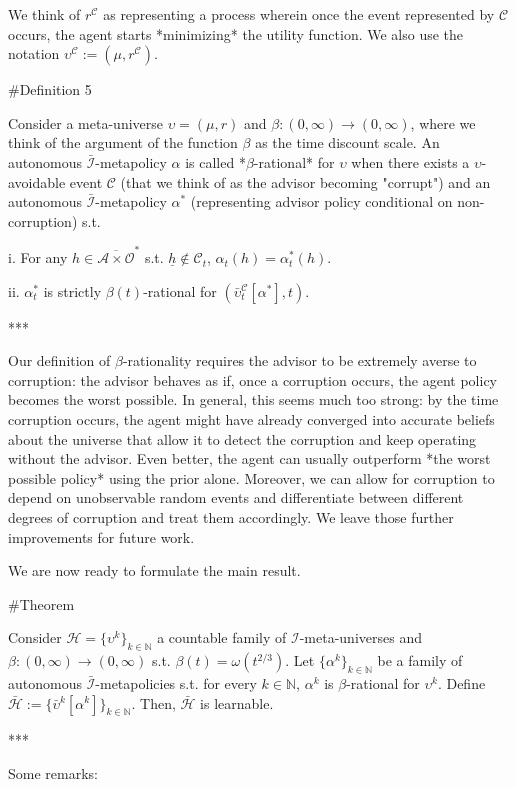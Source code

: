 \documentclass[a4paper]{article}
\newcommand{\Nats}{\mathbb{N}}
\newcommand{\Ob}{\mathcal{O}}
\newcommand{\A}{\mathcal{A}}
\newcommand{\I}{\mathcal{I}}
\newcommand{\Adi}{\bar{\I}}
\newcommand{\Adao}{\overline{\A \times \Ob}}
\newcommand{\Adfh}{\Adao^*}
\newcommand{\Hy}{\mathcal{H}}
\newcommand{\Co}{\mathcal{C}}
\begin{document}
We think of $r^\Co$ as representing a process wherein once the event represented by $\Co$ occurs, the agent starts *minimizing* the utility function. We also use the notation $\upsilon^\Co:=(\mu,r^\Co)$.

\#Definition 5

Consider a meta-universe $\upsilon=(\mu,r)$ and $\beta: (0,\infty) \rightarrow (0,\infty)$, where we think of the argument of the function $\beta$ as the time discount scale. An autonomous $\Adi$-metapolicy $\alpha$ is called *$\beta$-rational* for $\upsilon$ when there exists a $\upsilon$-avoidable event $\Co$ (that we think of as the advisor becoming "corrupt") and an autonomous $\Adi$-metapolicy $\alpha^*$ (representing advisor policy conditional on non-corruption) s.t. 

i. For any $h \in \Adfh$ s.t. $\underline{h} \not\in \Co_t$, $\alpha_t(h) = \alpha^*_t(h)$.

ii. $\alpha^*_t$ is strictly $\beta(t)$-rational for $(\bar{\upsilon}^\Co_t[\alpha^*], t)$.

***

Our definition of $\beta$-rationality requires the advisor to be extremely averse to corruption: the advisor behaves as if, once a corruption occurs, the agent policy becomes the worst possible. In general, this seems much too strong: by the time corruption occurs, the agent might have already converged into accurate beliefs about the universe that allow it to detect the corruption and keep operating without the advisor. Even better, the agent can usually outperform *the worst possible policy* using the prior alone. Moreover, we can allow for corruption to depend on unobservable random events and differentiate between different degrees of corruption and treat them accordingly. We leave those further improvements for future work.

We are now ready to formulate the main result.

\#Theorem

Consider $\Hy = \{\upsilon^k\}_{k \in \Nats}$ a countable family of $\I$-meta-universes and $\beta: (0,\infty) \rightarrow (0,\infty)$ s.t. $\beta(t) = \omega(t^{2/3})$. Let $\{\alpha^k\}_{k \in \Nats}$ be a family of autonomous $\Adi$-metapolicies s.t. for every $k \in \Nats$, $\alpha^k$ is $\beta$-rational for $\upsilon^k$. Define $\bar{\Hy}:=\{\bar{\upsilon}^k[\alpha^k]\}_{k \in \Nats}$. Then, $\bar{\Hy}$ is learnable.

***

Some remarks:
\end{document}
